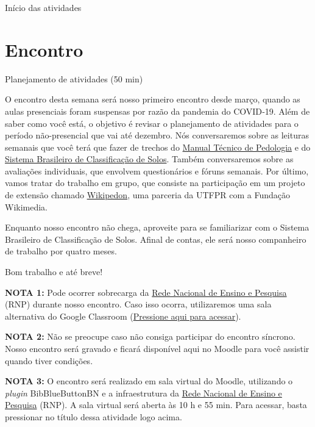 \documentclass[
  11pt,
  a4paper,
  dvipsnames]{tufte-book}
\begin{document}
Início das atividades

\hypertarget{encontro}{%
\section{Encontro}\label{encontro}}

Planejamento de atividades (50 min)

O encontro desta semana será nosso primeiro encontro desde março, quando as aulas presenciais foram suspensas por razão da pandemia do COVID‑19. Além de saber como você está, o objetivo é revisar o planejamento de atividades para o período não-presencial que vai até dezembro. Nós conversaremos sobre as leituras semanais que você terá que fazer de trechos do \href{https://biblioteca.ibge.gov.br/visualizacao/livros/liv95017.pdf}{Manual Técnico de Pedologia} e do \href{https://ainfo.cnptia.embrapa.br/digital/bitstream/item/199517/1/SiBCS-2018-ISBN-9788570358004.pdf}{Sistema Brasileiro de Classificação de Solos}. Também conversaremos sobre as avaliações individuais, que envolvem questionários e fóruns semanais. Por último, vamos tratar do trabalho em grupo, que consiste na participação em um projeto de extensão chamado \href{https://pt.wikipedia.org/wiki/Wikip\%C3\%A9dia:Outreach_Dashboard/Universidade_Tecnol\%C3\%B3gica_Federal_do_Paran\%C3\%A1/Wikipedon_2020-02_(2020)}{Wikipedon}, uma parceria da UTFPR com a Fundação Wikimedia.

Enquanto nosso encontro não chega, aproveite para se familiarizar com o Sistema Brasileiro de Classificação de Solos. Afinal de contas, ele será nosso companheiro de trabalho por quatro meses.

Bom trabalho e até breve!

\textbf{NOTA 1:} Pode ocorrer sobrecarga da \href{https://pt.wikipedia.org/wiki/Rede_Nacional_de_Ensino_e_Pesquisa}{Rede Nacional de Ensino e Pesquisa} (RNP) durante nosso encontro. Caso isso ocorra, utilizaremos uma sala alternativa do Google Classroom (\href{https://meet.google.com/lookup/c4saebrx42}{Pressione aqui para acessar}).

\textbf{NOTA 2:} Não se preocupe caso não consiga participar do encontro síncrono. Nosso encontro será gravado e ficará disponível aqui no Moodle para você assistir quando tiver condições.

\textbf{NOTA 3:} O encontro será realizado em sala virtual do Moodle, utilizando o \emph{plugin} BibBlueButtonBN e a infraestrutura da \href{https://pt.wikipedia.org/wiki/Rede_Nacional_de_Ensino_e_Pesquisa}{Rede Nacional de Ensino e Pesquisa} (RNP). A sala virtual será aberta às 10 h e 55 min. Para acessar, basta pressionar no título dessa atividade logo acima.
\end{document}
